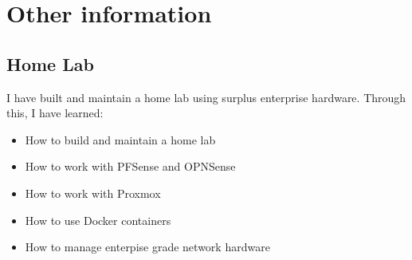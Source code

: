 \documentclass[letterpaper]{twentysecondcv} %
\begin{document}

\section{Other information}

\subsection{Home Lab}

I have built and maintain a home lab using surplus enterprise hardware.  Through this, I have learned:
\begin{itemize}
	\item How to build and maintain a home lab
	\item How to work with PFSense and OPNSense
	\item How to work with Proxmox
	\item How to use Docker containers
	\item How to manage enterpise grade network hardware
\end{itemize}






\end{document}
